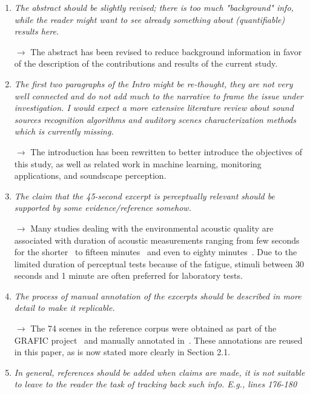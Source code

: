 \documentclass[10pt]{article}
\begin{document}
\begin{enumerate}

\item \emph{The abstract should be slightly revised; there is too much "background" info, while the reader might want to see already something about (quantifiable) results here.}

$\rightarrow$ The abstract has been revised to reduce background information in favor of the description of the contributions and results of the current study.

\item \emph{The first two paragraphs of the Intro might be re-thought, they are not very well connected and do not add much to the narrative to frame the issue under investigation. I would expect a more extensive literature review about sound sources recognition algorithms and auditory scenes characterization methods which is currently missing.}

$\rightarrow$ The introduction has been rewritten to better introduce the objectives of this study, as well as related work in machine learning, monitoring applications, and soundscape perception.

\item \emph{The claim that the 45-second excerpt is perceptually relevant should be supported by some evidence/reference somehow.}

$\rightarrow$ Many studies dealing with the environmental acoustic quality are associated with duration of acoustic measurements ranging from few seconds for the shorter~\cite{paulsen1997, brambilla2006} to fifteen minutes~\cite{kuwano1997, decoensel2007} and even to eighty minutes~\cite{namba1988}. Due to the limited duration of perceptual tests because of the fatigue, stimuli between 30 seconds and 1 minute are often preferred for laboratory tests.

\item \emph{The process of manual annotation of the excerpts should be described in more detail to make it replicable.}

$\rightarrow$ The 74 scenes in the reference corpus were obtained as part of the GRAFIC project~\cite{aumond2017} and manually annotated in~\cite{gloaguen2017}. These annotations are reused in this paper, as is now stated more clearly in Section 2.1.

\item \emph{In general, references should be added when claims are made, it is not suitable to leave to the reader the task of tracking back such info. E.g., lines 176-180}


\end{enumerate}
\end{document}
